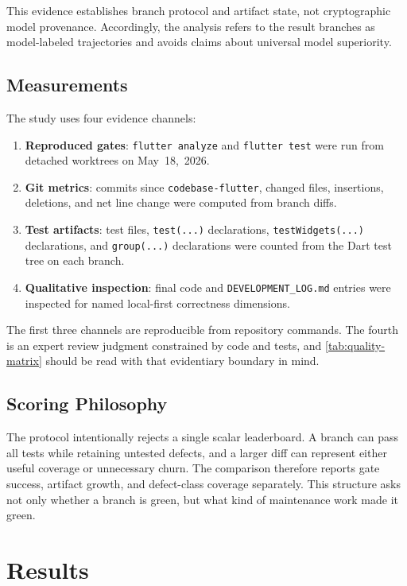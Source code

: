\documentclass[11pt]{article}
\newcommand{\BaseBranch}{\texttt{codebase-\allowbreak flutter}}
\newcommand{\DevLog}{\texttt{DEVELOPMENT\_LOG.md}}
\newcommand{\AnalyzeCmd}{\texttt{flutter analyze}}
\newcommand{\TestCmd}{\texttt{flutter test}}
\newcommand{\VerificationDate}{May~18,~2026}
\begin{document}
This evidence establishes branch protocol and artifact state, not cryptographic model provenance. Accordingly, the analysis refers to the result branches as model-labeled trajectories and avoids claims about universal model superiority.

\subsection{Measurements}
\label{sec:measurements}

The study uses four evidence channels:

\begin{enumerate}
  \item \textbf{Reproduced gates}: \AnalyzeCmd{} and \TestCmd{} were run from detached worktrees on \VerificationDate{}.
  \item \textbf{Git metrics}: commits since \BaseBranch{}, changed files, insertions, deletions, and net line change were computed from branch diffs.
  \item \textbf{Test artifacts}: test files, \texttt{test(...)} declarations, \texttt{testWidgets(...)} declarations, and \texttt{group(...)} declarations were counted from the Dart test tree on each branch.
  \item \textbf{Qualitative inspection}: final code and \DevLog{} entries were inspected for named local-first correctness dimensions.
\end{enumerate}

The first three channels are reproducible from repository commands. The fourth is an expert review judgment constrained by code and tests, and \cref{tab:quality-matrix} should be read with that evidentiary boundary in mind.

\subsection{Scoring Philosophy}
\label{sec:scoring}

The protocol intentionally rejects a single scalar leaderboard. A branch can pass all tests while retaining untested defects, and a larger diff can represent either useful coverage or unnecessary churn. The comparison therefore reports gate success, artifact growth, and defect-class coverage separately. This structure asks not only whether a branch is green, but what kind of maintenance work made it green.

\section{Results}
\label{sec:results}
\end{document}
